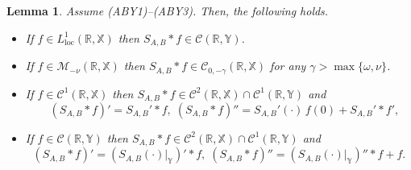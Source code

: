 \documentclass[11pt]{amsart}
\numberwithin{equation}{section}
\newtheorem{lemma}[theorem]{Lemma}
\theoremstyle{remark}
\theoremstyle{definition}
\newcommand\bX{{\mathbb X}}
\newcommand\bY{{\mathbb Y}}
\begin{document}
\begin{lemma}\label{l5.2} Assume \textnormal{(ABY1)--(ABY3)}. Then, the following holds.
	\begin{itemize}
		\item[(i)] If $f \in L^1_{\mathrm{loc}}(\mathbb{R}, \bX)$ then $S_{A,B} * f \in \mathcal{C}(\mathbb{R}, \bY)$.
		\item[(ii)] If $f \in \mathcal{M}_{-\nu}(\mathbb{R}, \bX)$ then $S_{A,B} * f \in \mathcal{C}_{0,-\gamma}(\mathbb{R}, \bX)$ for any $\gamma > \max\{\omega, \nu\}$.
		\item[(iii)] If $f \in \mathcal{C}^1(\mathbb{R}, \bX)$ then $S_{A,B} * f \in \mathcal{C}^2(\mathbb{R}, \bX)\cap \mathcal{C}^1(\mathbb{R}, \bY)$ and
		\begin{equation}\label{Sf-prime} \quad (S_{A,B} * f)' = S_{A,B}' * f,\;  (S_{A,B} * f)'' = S_{A,B}'(\cdot)\,f(0) + S_{A,B}' * f', 
		\end{equation}
		\item[(iv)] If $f \in \mathcal{C}(\mathbb{R}, \bY)$ then $S_{A,B} * f \in \mathcal{C}^2(\mathbb{R}, \bX)\cap \mathcal{C}^1(\mathbb{R}, \bY)$ and
		\begin{equation}\label{Sf-primeY}
			(S_{A,B} * f)' = (S_{A,B}(\cdot)|_\bY)' * f,\;  (S_{A,B} * f)'' = (S_{A,B}(\cdot)|_\bY)'' * f + f.
		\end{equation}
	\end{itemize}
\end{lemma}
\end{document}
